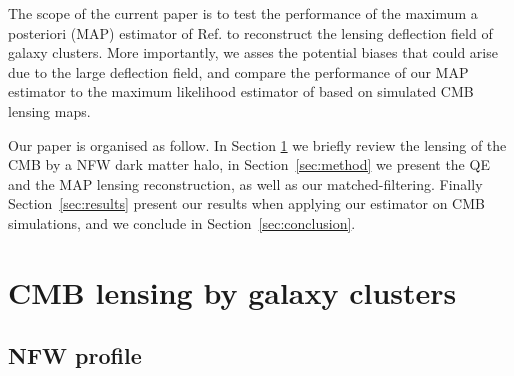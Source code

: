 \documentclass[prd, superscriptaddress, tightenlines, longbibliography, nofootinbib, eqsecnum, amsfonts, amsmath, floatfix, twocolumn, notitlepage]{revtex4-2}
\begin{document}
%

The scope of the current paper is to test the performance of the maximum a posteriori (MAP) estimator of Ref. \cite{Carron:2017mqf} to reconstruct the lensing deflection field of galaxy clusters. More importantly, we asses the potential biases that could arise due to the large deflection field, and compare the performance of our MAP estimator to the maximum likelihood estimator of \cite{Raghunathan:2017cle} based on simulated CMB lensing maps. 


Our paper is organised as follow. In Section \ref{sec:model} we briefly review the lensing of the CMB by a NFW dark matter halo, in Section~\ref{sec:method} we present the QE and the MAP lensing reconstruction, as well as our matched-filtering. Finally Section~\ref{sec:results} present our results when applying our estimator on CMB simulations, and we conclude in Section~\ref{sec:conclusion}.


\section{CMB lensing by galaxy clusters}
\label{sec:model}
\subsection{NFW profile}
\end{document}
